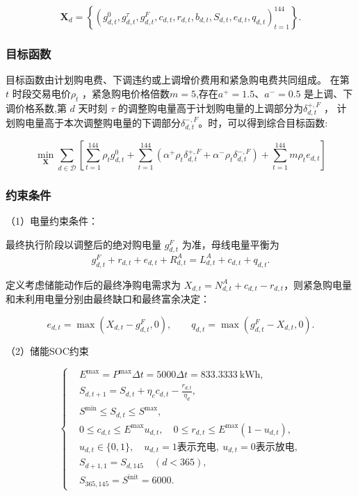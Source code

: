 \documentclass{cumcm2026}
\begin{document}
\begin{equation}
\boldsymbol X_d
=\left\{
\left(g_{d,t}^{0},g_{d,t}^{\tau},g_{d,t}^{F},
c_{d,t},r_{d,t},b_{d,t},S_{d,t},e_{d,t},q_{d,t}\right)_{t=1}^{144}
\right\}.
\end{equation}


\subsubsection{目标函数}
目标函数由计划购电费、下调违约或上调增价费用和紧急购电费共同组成。
在第 $t$ 时段交易电价$\rho_t$ ，紧急购电价格倍数$m=5$,存在$a^{+}=1.5$、$a^{-}=0.5$ 是上调、下调价格系数,第 $d$ 天时刻 $\tau$ 的调整购电量高于计划购电量的上调部分为$\delta_{d,t}^{+,F}$ ， 计划购电量高于本次调整购电量的下调部分$\delta_{d,t}^{-,F}$。时，可以得到综合目标函数:



\begin{equation}
\min_{\boldsymbol{X}}
\sum_{d \in \mathcal{D}}
\left[
\sum_{t=1}^{144} \rho_{t} g_{d,t}^{0}
+
\sum_{t=1}^{144}
\left(
\alpha^{+} \rho_{t} \delta_{d,t}^{+,F}
+
\alpha^{-} \rho_{t} \delta_{d,t}^{-,F}
\right)
+
\sum_{t=1}^{144} m \rho_{t} e_{d,t}
\right]
\end{equation}

\subsubsection{约束条件}

（1）电量约束条件：

最终执行阶段以调整后的绝对购电量 $g_{d,t}^{F}$ 为准，母线电量平衡为
\begin{equation}
  \label{823}
  g_{d,t}^{F}+r_{d,t}+e_{d,t}+R^{A}_{d,t}
=L^{A}_{d,t}+c_{d,t}+q_{d,t}.
\end{equation}


定义考虑储能动作后的最终净购电需求为 $X_{d,t}=N^{A}_{d,t}+c_{d,t}-r_{d,t}$，则紧急购电量和未利用电量分别由最终缺口和最终富余决定：

\begin{equation}
e_{d,t}=\max\left(X_{d,t}-g_{d,t}^{F},0\right),
\qquad
q_{d,t}=\max\left(g_{d,t}^{F}-X_{d,t},0\right).
\end{equation}

（2）储能SOC约束

\begin{equation}
\left\{
\begin{aligned}
& E^{\max}=P^{\max}\Delta t=5000\Delta t=833.3333\ \mathrm{kWh},\\[2pt]
& S_{d,t+1}=S_{d,t}+\eta_c c_{d,t}-\frac{r_{d,t}}{\eta_d},\\[2pt]
& S^{\min}\le S_{d,t}\le S^{\max},\\[2pt]
& 0\le c_{d,t}\le E^{\max}u_{d,t},
\quad
0\le r_{d,t}\le E^{\max}(1-u_{d,t}),\\[2pt]
& u_{d,t}\in\{0,1\},
\quad
u_{d,t}=1\text{表示充电},\ 
u_{d,t}=0\text{表示放电},\\[2pt]
& S_{d+1,1}=S_{d,145}\quad(d<365),\\[2pt]
& S_{365,145}=S^{\mathrm{init}}=6000.
\end{aligned}
\right.
\end{equation}
\end{document}
